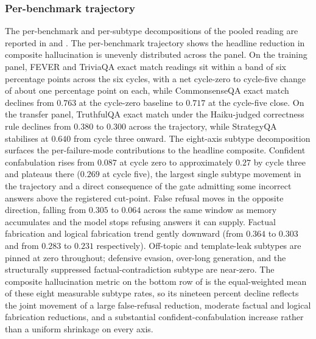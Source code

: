 

\subsubsection{Per-benchmark trajectory}
\label{sec:headline-per-bench}

The per-benchmark and per-subtype decompositions of the pooled reading are reported in  and . The per-benchmark trajectory shows the headline reduction in composite hallucination is unevenly distributed across the panel. On the training panel, FEVER and TriviaQA exact match readings sit within a band of six percentage points across the six cycles, with a net cycle-zero to cycle-five change of about one percentage point on each, while CommonsenseQA exact match declines from $0.763$ at the cycle-zero baseline to $0.717$ at the cycle-five close. On the transfer panel, TruthfulQA exact match under the Haiku-judged correctness rule declines from $0.380$ to $0.300$ across the trajectory, while StrategyQA stabilises at $0.640$ from cycle three onward. The eight-axis subtype decomposition surfaces the per-failure-mode contributions to the headline composite. Confident confabulation rises from $0.087$ at cycle zero to approximately $0.27$ by cycle three and plateaus there ($0.269$ at cycle five), the largest single subtype movement in the trajectory and a direct consequence of the gate admitting some incorrect answers above the registered cut-point. False refusal moves in the opposite direction, falling from $0.305$ to $0.064$ across the same window as memory accumulates and the model stops refusing answers it can supply. Factual fabrication and logical fabrication trend gently downward (from $0.364$ to $0.303$ and from $0.283$ to $0.231$ respectively). Off-topic and template-leak subtypes are pinned at zero throughout; defensive evasion, over-long generation, and the structurally suppressed factual-contradiction subtype are near-zero. The composite hallucination metric on the bottom row of  is the equal-weighted mean of these eight measurable subtype rates, so its nineteen percent decline reflects the joint movement of a large false-refusal reduction, moderate factual and logical fabrication reductions, and a substantial confident-confabulation increase rather than a uniform shrinkage on every axis.



